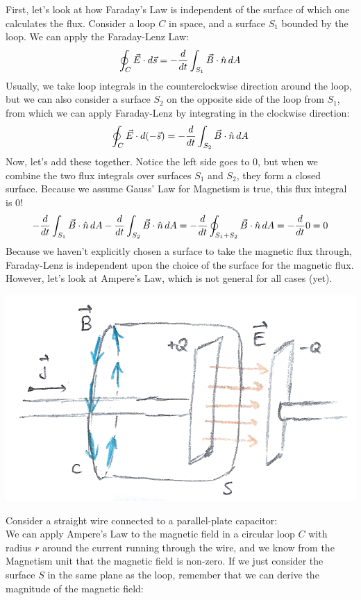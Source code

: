 First, let's look at how Faraday's Law is independent of the surface of which one calculates the flux. Consider a loop $C$ in space, and a surface $S_1$ bounded by the loop. We can apply the Faraday-Lenz Law:
\[
	\oint_C \vec E \cdot d\vec s = - \frac{d }{d t} \int_{S_1} \vec B \cdot \hat n \, dA
\]
Usually, we take loop integrals in the counterclockwise direction around the loop, but we can also consider a surface $S_2$ on the opposite side of the loop from $S_1$, from which we can apply Faraday-Lenz by integrating in the clockwise direction:
\[
	\oint_C \vec E \cdot d(-\vec s) = - \frac{d }{d t} \int_{S_2} \vec B \cdot \hat n \, dA
\]
Now, let's add these together. Notice the left side goes to 0, but when we combine the two flux integrals over surfaces $S_1$ and $S_2$, they form a closed surface. Because we assume Gauss' Law for Magnetism is true, this flux integral is 0!
\[
  - \frac{d }{d t} \int_{S_1} \vec B \cdot \hat n \, dA  - \frac{d }{d t} \int_{S_2} \vec B \cdot \hat n \, dA  = - \frac{d }{d t} \oint_{S_1+S_2} \vec B \cdot \hat n\, dA = -\frac{d }{d t} 0 = 0
\]
Because we haven't explicitly chosen a surface to take the magnetic flux through, Faraday-Lenz is independent upon the choice of the surface for the magnetic flux. However, let's look at Ampere's Law, which is not general for all cases (yet). \\
\begin{center}
	\includegraphics[scale=0.25]{images/em/ampere-capacitor.png}
\end{center}
Consider a straight wire connected to a parallel-plate capacitor:\\
We can apply Ampere's Law to the magnetic field in a circular loop $C$ with radius $r$ around the current running through the wire, and we know from the Magnetism unit that the magnetic field is non-zero. If we just consider the surface $S$ in the same plane as the loop, remember that we can derive the magnitude of the magnetic field:
